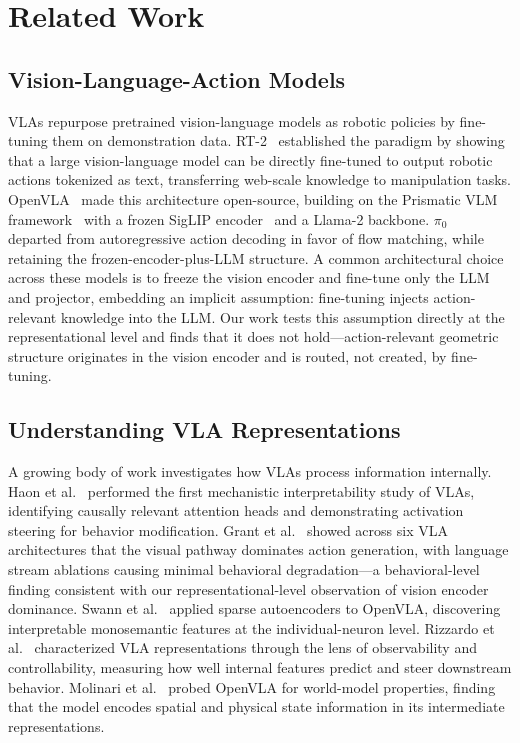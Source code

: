 \section{Related Work}
\label{sec:related_work}

\subsection{Vision-Language-Action Models}

VLAs repurpose pretrained vision-language models as robotic policies by fine-tuning them on demonstration data.
RT-2~\cite{brohan2023_rt2} established the paradigm by showing that a large vision-language model can be directly fine-tuned to output robotic actions tokenized as text, transferring web-scale knowledge to manipulation tasks.
OpenVLA~\cite{kim2024_openvla} made this architecture open-source, building on the Prismatic VLM framework~\cite{karamcheti2024} with a frozen SigLIP encoder~\cite{zhai2023_siglip} and a Llama-2 backbone.
$\pi_0$~\cite{black2024_pi0} departed from autoregressive action decoding in favor of flow matching, while retaining the frozen-encoder-plus-LLM structure.
A common architectural choice across these models is to freeze the vision encoder and fine-tune only the LLM and projector, embedding an implicit assumption: fine-tuning injects action-relevant knowledge into the LLM.
Our work tests this assumption directly at the representational level and finds that it does not hold---action-relevant geometric structure originates in the vision encoder and is routed, not created, by fine-tuning.

\subsection{Understanding VLA Representations}

A growing body of work investigates how VLAs process information internally.
Haon et al.~\cite{haon2025} performed the first mechanistic interpretability study of VLAs, identifying causally relevant attention heads and demonstrating activation steering for behavior modification.
Grant et al.~\cite{grant2026} showed across six VLA architectures that the visual pathway dominates action generation, with language stream ablations causing minimal behavioral degradation---a behavioral-level finding consistent with our representational-level observation of vision encoder dominance.
Swann et al.~\cite{swann2026} applied sparse autoencoders to OpenVLA, discovering interpretable monosemantic features at the individual-neuron level.
Rizzardo et al.~\cite{rizzardo2026} characterized VLA representations through the lens of observability and controllability, measuring how well internal features predict and steer downstream behavior.
Molinari et al.~\cite{molinari2025} probed OpenVLA for world-model properties, finding that the model encodes spatial and physical state information in its intermediate representations.

